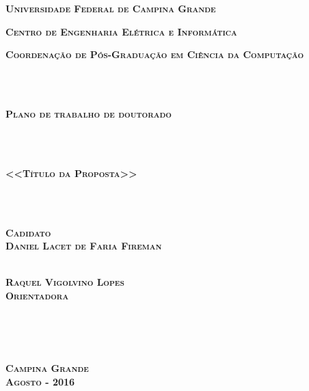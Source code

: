 
\pagestyle{empty}

\begin{center}
{\textbf{\Large \textsc{Universidade Federal de Campina Grande}}}
\end{center}

\begin{center}
\textbf{{\Large \textsc{Centro de Engenharia Elétrica e Informática}}}
\end{center}

\begin{center}
{\large \textsc{\textbf{Coordenação de Pós-Graduação em Ciência da Computação}}}
\end{center}

~\\ \\

\begin{center}
{\LARGE \textsc{\textbf{Plano de trabalho de doutorado}}}
\end{center}

~\\ \\

\begin{center}
{\Large \textsc{\textbf{<<Título da Proposta>>}}}
\end{center}

~\\ \\

\begin{center}
\textbf{\textsc{Cadidato} \\
\textsc{Daniel Lacet de Faria Fireman}}
\end{center}

\vspace{2in}

\begin{center}
\makebox[3in]{\hrulefill} \\
\textbf{\textsc{Raquel Vigolvino Lopes} \\
\textsc{Orientadora}}
\end{center}

~\\ \\ \\

\begin{center}
\textbf{{\large \textsc{Campina Grande}}
\\
{\large \textsc{Agosto - 2016}}}
\end{center}

\newpage
\cleardoublepage

